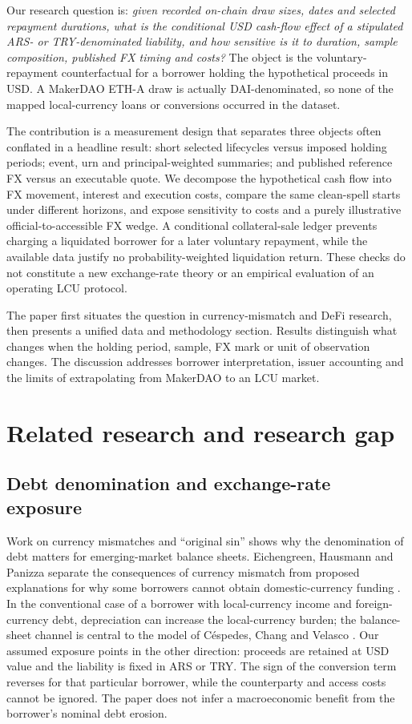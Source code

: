 \documentclass[sn-vancouver,Numbered]{sn-jnl}
\begin{document}
Our research question is: \emph{given recorded on-chain draw sizes, dates and selected repayment durations, what is the conditional USD cash-flow effect of a stipulated ARS- or TRY-denominated liability, and how sensitive is it to duration, sample composition, published FX timing and costs?} The object is the voluntary-repayment counterfactual for a borrower holding the hypothetical proceeds in USD. A MakerDAO ETH-A draw is actually DAI-denominated, so none of the mapped local-currency loans or conversions occurred in the dataset.

The contribution is a measurement design that separates three objects often conflated in a headline result: short selected lifecycles versus imposed holding periods; event, urn and principal-weighted summaries; and published reference FX versus an executable quote. We decompose the hypothetical cash flow into FX movement, interest and execution costs, compare the same clean-spell starts under different horizons, and expose sensitivity to costs and a purely illustrative official-to-accessible FX wedge. A conditional collateral-sale ledger prevents charging a liquidated borrower for a later voluntary repayment, while the available data justify no probability-weighted liquidation return. These checks do not constitute a new exchange-rate theory or an empirical evaluation of an operating LCU protocol.

The paper first situates the question in currency-mismatch and DeFi research, then presents a unified data and methodology section. Results distinguish what changes when the holding period, sample, FX mark or unit of observation changes. The discussion addresses borrower interpretation, issuer accounting and the limits of extrapolating from MakerDAO to an LCU market.

\section{Related research and research gap}
\subsection{Debt denomination and exchange-rate exposure}
Work on currency mismatches and ``original sin'' shows why the denomination of debt matters for emerging-market balance sheets. Eichengreen, Hausmann and Panizza separate the consequences of currency mismatch from proposed explanations for why some borrowers cannot obtain domestic-currency funding \cite{EichengreenHausmannPanizza2003}. In the conventional case of a borrower with local-currency income and foreign-currency debt, depreciation can increase the local-currency burden; the balance-sheet channel is central to the model of C\'espedes, Chang and Velasco \cite{CespedesChangVelasco2004}. Our assumed exposure points in the other direction: proceeds are retained at USD value and the liability is fixed in ARS or TRY. The sign of the conversion term reverses for that particular borrower, while the counterparty and access costs cannot be ignored. The paper does not infer a macroeconomic benefit from the borrower's nominal debt erosion.
\end{document}
